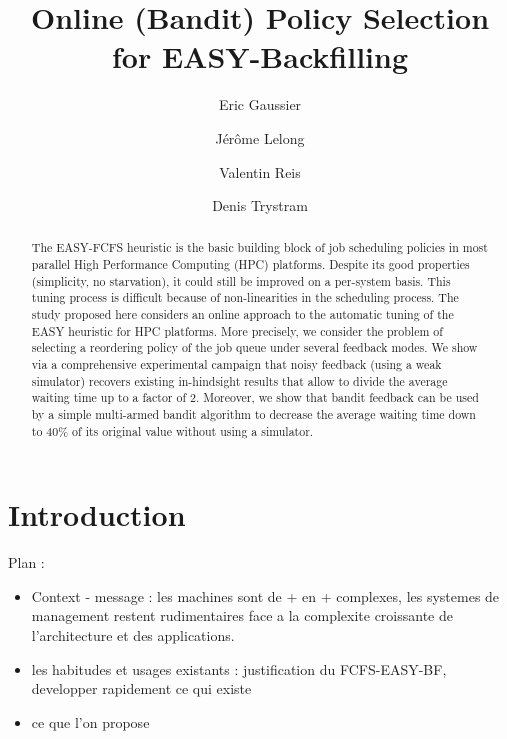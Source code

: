 \documentclass[sigconf]{acmart}
\begin{document}
%
\title{Online (Bandit) Policy Selection for EASY-Backfilling}

\author{Eric Gaussier}
\author{J\'er\^ome Lelong}
\author{Valentin Reis}
\author{Denis Trystram}

\begin{abstract}

  The EASY-FCFS heuristic is the basic building block of job scheduling
  policies in most parallel High Performance Computing (HPC) platforms. Despite
  its good properties (simplicity, no starvation), it could still be improved
  on a per-system basis. This tuning process is difficult because of
  non-linearities in the scheduling process. The study proposed here considers
  an online approach to the automatic tuning of the EASY heuristic for HPC
  platforms. More precisely, we consider the problem of selecting a reordering
  policy of the job queue under several feedback modes. We show via a
  comprehensive experimental campaign that noisy feedback (using a weak
  simulator) recovers existing in-hindsight results that allow to divide the
  average waiting time up to a factor of 2. Moreover, we show that bandit
  feedback can be used by a simple multi-armed bandit algorithm to decrease the
  average waiting time down to 40\% of its original value without using a
  simulator.

\end{abstract}

\maketitle

\section{Introduction}
\label{sec:intro}

Plan :
\begin{itemize}
\item Context - message : les machines sont de + en + complexes, les systemes
de management restent rudimentaires face a la complexite croissante de
l'architecture et des applications.
\item les habitudes et usages existants : justification du FCFS-EASY-BF,
developper rapidement ce qui existe
\item ce que l'on propose
\end{itemize}
\end{document}
